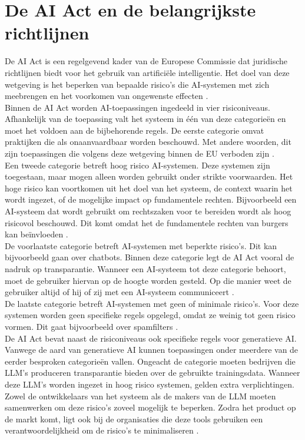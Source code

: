 \section{De AI Act en de belangrijkste richtlijnen}
De AI Act is een regelgevend kader van de Europese Commissie dat juridische richtlijnen biedt voor het gebruik van artificiële intelligentie. Het doel van deze wetgeving is het beperken van bepaalde risico’s die AI-systemen met zich meebrengen en het voorkomen van ongewenste effecten \autocite{EUAIAct2024}.
\\[1em]
Binnen de AI Act worden AI-toepassingen ingedeeld in vier risiconiveaus. Afhankelijk van de toepassing valt het systeem in één van deze categorieën en moet het voldoen aan de bijbehorende regels. De eerste categorie omvat praktijken die als onaanvaardbaar worden beschouwd. Met andere woorden, dit zijn toepassingen die volgens deze wetgeving binnen de EU verboden zijn \autocite{EUAIAct2024}.
\\[1em]
Een tweede categorie betreft hoog risico AI-systemen. Deze systemen zijn toegestaan, maar mogen alleen worden gebruikt onder strikte voorwaarden. Het hoge risico kan voortkomen uit het doel van het systeem, de context waarin het wordt ingezet, of de mogelijke impact op fundamentele rechten. Bijvoorbeeld een AI-systeem dat wordt gebruikt om rechtszaken voor te bereiden wordt als hoog risicovol beschouwd. Dit komt omdat het de fundamentele rechten van burgers kan beïnvloeden \autocite{EUAIAct2024}.
\\[1em]
De voorlaatste categorie betreft AI-systemen met beperkte risico’s. Dit kan bijvoorbeeld gaan over chatbots. Binnen deze categorie legt de AI Act vooral de nadruk op transparantie. Wanneer een AI-systeem tot deze categorie behoort, moet de gebruiker hiervan op de hoogte worden gesteld. Op die manier weet de gebruiker altijd of hij of zij met een AI-systeem communiceert \autocite{EUAIAct2024}.
\\[1em]
De laatste categorie betreft AI-systemen met geen of minimale risico’s. Voor deze systemen worden geen specifieke regels opgelegd, omdat ze weinig tot geen risico vormen. Dit gaat bijvoorbeeld over spamfilters \autocite{EUAIAct2024}.
\\[1em]
De AI Act bevat naast de risiconiveaus ook specifieke regels voor generatieve AI. Vanwege de aard van generatieve AI kunnen toepassingen onder meerdere van de eerder besproken categorieën vallen. Ongeacht de categorie moeten bedrijven die LLM’s produceren transparantie bieden over de gebruikte trainingsdata. Wanneer deze LLM’s worden ingezet in hoog risico systemen, gelden extra verplichtingen. Zowel de ontwikkelaars van het systeem als de makers van de LLM moeten samenwerken om deze risico’s zoveel mogelijk te beperken. Zodra het product op de markt komt, ligt ook bij de organisaties die deze tools gebruiken een verantwoordelijkheid om de risico’s te minimaliseren \autocite{EUAIAct2024}.
